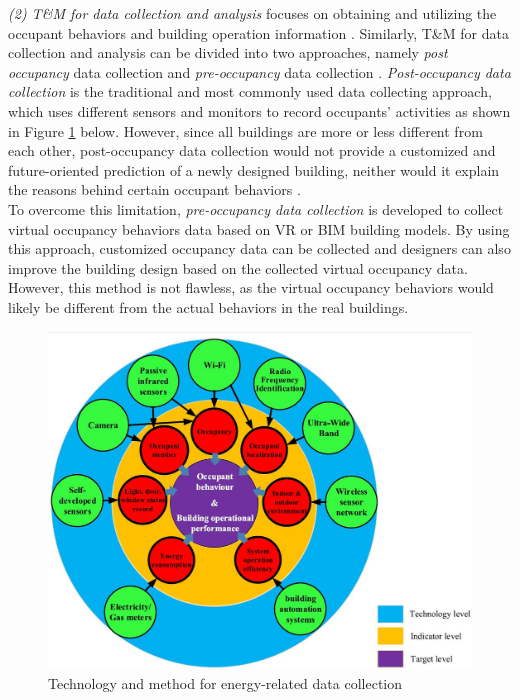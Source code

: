 \documentclass[a4paper, oneside]{discothesis}
\begin{document}
			\textit{(2) T\&M for data collection and analysis} 
			focuses on obtaining and utilizing the occupant behaviors and building operation information \cite{ZOU2018165}. Similarly, T\&M for data collection and analysis can be divided into two approaches, namely \textit{post occupancy} data collection and \textit{pre-occupancy} data collection \cite{ZOU2018165}. \textit{Post-occupancy data collection} is the traditional and most commonly used data collecting approach, which uses different sensors and monitors to record occupants' activities as shown in Figure \ref{fig:Energy_DataCollection} below. However, since all buildings are more or less different from each other, post-occupancy data collection would not provide a customized and future-oriented prediction of a newly designed building, neither would it explain the reasons behind certain occupant behaviors \cite{NIU2016275}.\\

			To overcome this limitation, \textit{pre-occupancy data collection} is developed to collect virtual occupancy behaviors data based on VR or BIM building models. By using this approach, customized occupancy data can be collected and designers can also improve the building design based on the collected virtual occupancy data. However, this method is not flawless, as the virtual occupancy behaviors would likely be different from the actual behaviors in the real buildings.\\


			\begin{figure}[h!]
			\centering
			\includegraphics[scale=0.5]{Energy-relatedData.jpg}
			\caption{Technology and method for energy-related data collection \cite{jia2017occupancy}}
			\label{fig:Energy_DataCollection}
			\end{figure}
\end{document}
